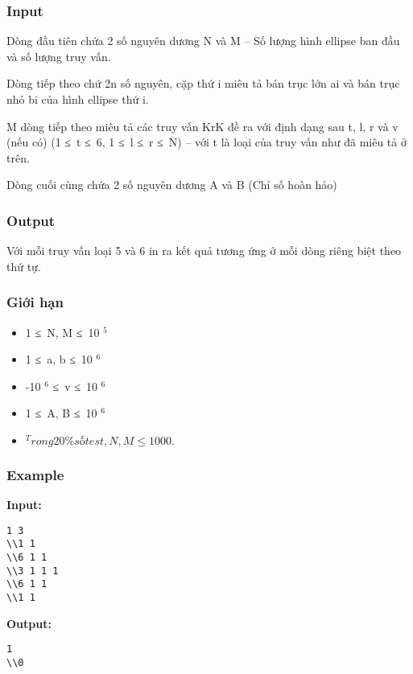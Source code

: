 \subsubsection{   Input  }

   Dòng đầu tiên chứa 2 số nguyên dương N và M – Số lượng hình ellipse ban đầu và số lượng truy vấn.  

   Dòng tiếp theo chứ 2n số nguyên, cặp thứ i miêu tả bán trục lớn ai và bán trục nhỏ bi của hình ellipse thứ i.  

   M dòng tiếp theo miêu tả các truy vấn KrK đề ra với định dạng sau t, l, r và v (nếu có) (1 ≤ t ≤ 6, 1 ≤ l ≤ r ≤ N) – với t là loại của truy vấn như đã miêu tả ở trên.  

   Dòng cuối cùng chứa 2 số nguyên dương A và B (Chỉ số hoàn hảo)  

\subsubsection{   Output  }

   Với mỗi truy vấn loại 5 và 6 in ra kết quả tương ứng ở mỗi dòng riêng biệt theo thứ tự.  

\subsubsection{   Giới hạn  }


\begin{itemize}
	\item     1 ≤ N, M ≤ 10    $^     5    $
	\item     1 ≤ a, b ≤ 10    $^     6    $
	\item     -10    $^     6    $    ≤ v ≤ 10    $^     6    $
	\item     1 ≤ A, B ≤ 10    $^     6    $
	\item $^     Trong 20\% số test, N, M ≤ 1000.    $
\end{itemize}



\subsubsection{   Example  }

\textbf{    Input:   }
\begin{verbatim}
1 3
\\1 1
\\6 1 1 
\\3 1 1 1 
\\6 1 1
\\1 1\end{verbatim}

\textbf{    Output:   }
\begin{verbatim}
1
\\0\end{verbatim}